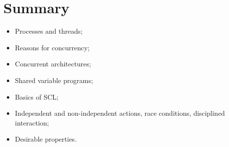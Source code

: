 \section{Summary}

\begin{itemize}
\item
Processes and threads;

\item
Reasons for concurrency;

\item
Concurrent architectures;

\item
Shared variable programs; 

\item
Basics of SCL;

\item
Independent and non-independent actions, race conditions, disciplined
interaction; 

\item
Desirable properties.
\end{itemize}


\exercises









